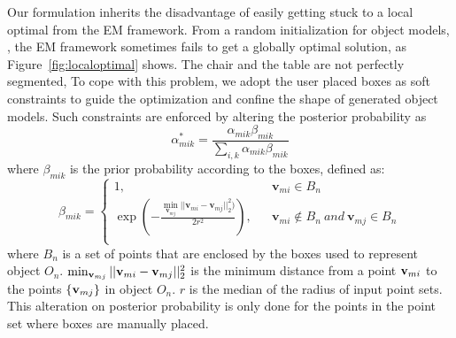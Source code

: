 Our formulation inherits the disadvantage of easily getting stuck to a local optimal from the EM framework.
From a random initialization for object models,
, the EM framework sometimes fails to get a globally optimal solution, as Figure~\ref{fig:localoptimal} shows. 
The chair and the table are not perfectly segmented,  
%
To cope with this problem, we adopt the user placed boxes as soft constraints to guide the optimization and confine the shape of generated object models. 
Such constraints are enforced by altering the posterior probability as
\begin{equation}
	\label{equ:alteralpha}
	\alpha_{mik}^*=\frac{\alpha_{mik}\beta_{mik}}{\sum_{i,k}\alpha_{mik}\beta_{mik}}
\end{equation}
%
where $\beta_{mik}$ is the prior probability according to the boxes, defined as:
\begin{equation}
	\beta_{mik}=\left\{
	\begin{array}{lcl}
		1,& &\mathbf v_{mi} \in B_n\\
		\exp(-\frac{\min_{\mathbf v_{mj}}|| \mathbf v_{mi} - \mathbf v_{mj} ||_2^2  )}{
			2r^2}),& &\mathbf v_{mi} \notin B_n~and~\mathbf v_{mj} \in B_n\\
	\end{array} \right.
\end{equation}
%
where $B_n$ is a set of points that are enclosed by the boxes used to represent object $O_{n}$. 
%
$\min_{\mathbf{v}_{mj}}|| \mathbf{v}_{mi} - \mathbf{v}_{mj} ||_2^2$ is the minimum distance from a point $\mathbf{v}_{mi}$ to the points $\{\mathbf{v}_{mj}\}$ in object $O_n$.
$r$ is the median of the radius of input point sets.
%   
This alteration on posterior probability is only done for the points in the point set where boxes are manually placed. 
%

